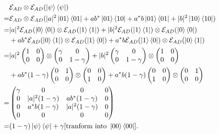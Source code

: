 \ex $$\begin{aligned}
    & \mathcal{E}_{AD}\otimes\mathcal{E}_{AD}(\left|\psi\right\rangle\left\langle\psi\right|)
    \\ = & \mathcal{E}_{AD}\otimes\mathcal{E}_{AD}(|a|^2\left|01\right\rangle\left\langle01\right|+ab^*\left|01\right\rangle\left\langle10\right|+a^*b\left|01\right\rangle\left\langle01\right|+|b|^2\left|10\right\rangle\left\langle10\right|)
    \\ = & |a|^2\mathcal{E}_{AD}(\left|0\right\rangle\left\langle0\right|)\otimes\mathcal{E}_{AD}(\left|1\right\rangle\left\langle1\right|) + |b|^2\mathcal{E}_{AD}(\left|1\right\rangle\left\langle1\right|)\otimes\mathcal{E}_{AD}(\left|0\right\rangle\left\langle0\right|)
    \\ & + ab^*\mathcal{E}_{AD}(\left|0\right\rangle\left\langle1\right|)\otimes\mathcal{E}_{AD}(\left|1\right\rangle\left\langle0\right|) + a^*b\mathcal{E}_{AD}(\left|1\right\rangle\left\langle0\right|)\otimes\mathcal{E}_{AD}(\left|0\right\rangle\left\langle1\right|)
    \\ = & |a|^2 \begin{pmatrix} 1 & 0 \\ 0 & 0 \end{pmatrix} \otimes \begin{pmatrix} \gamma & 0 \\ 0 & 1-\gamma \end{pmatrix} + |b|^2 \begin{pmatrix} \gamma & 0 \\ 0 & 1-\gamma \end{pmatrix} \otimes \begin{pmatrix} 1 & 0 \\ 0 & 0 \end{pmatrix}
    \\ & + ab^*(1-\gamma) \begin{pmatrix} 0 & 1 \\ 0 & 0 \end{pmatrix} \otimes \begin{pmatrix} 0 & 0 \\ 1& 0 \end{pmatrix} + a^*b(1-\gamma) \begin{pmatrix} 0 & 0 \\ 1 & 0 \end{pmatrix} \otimes \begin{pmatrix} 0 & 1 \\ 0 & 0 \end{pmatrix}
    \\ = & \begin{pmatrix}
        \gamma & 0 & 0 & 0 \\
        0 & |a|^2(1-\gamma) & ab^*(1-\gamma) & 0 \\
        0 & a^*b(1-\gamma) & |a|^2(1-\gamma) & 0 \\
        0 & 0 & 0 & 0
    \end{pmatrix}
    \\ = & (1-\gamma)\left|\psi\right\rangle\left\langle\psi\right| + \gamma[\text{tranform into }\left|00\right\rangle\left\langle00\right|].
\end{aligned}$$

